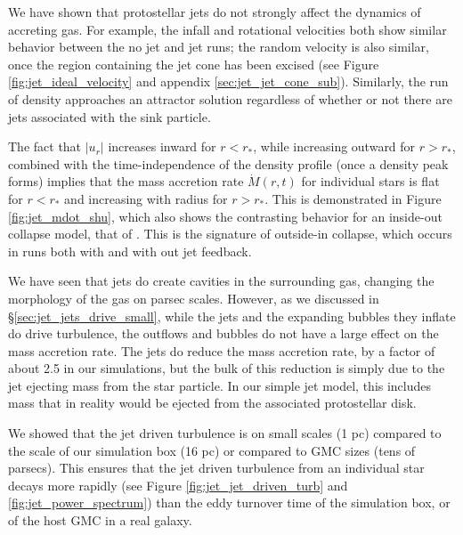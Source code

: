 \documentclass[../dissertation.tex]{subfiles}
\begin{document}
We have shown that protostellar jets do not strongly affect the dynamics of accreting gas.
For example, the infall and rotational velocities both show similar behavior between the no jet and jet runs; the random velocity is also similar, once the region containing the jet cone has been excised (see Figure \ref{fig:jet_ideal_velocity} and appendix \ref{sec:jet_jet_cone_sub}).
Similarly, the run of density approaches an attractor solution regardless of whether or not there are jets associated with the sink particle.

The fact that $|u_r|$ increases inward for $r<r_*$, while increasing outward for $r>r_*$, combined with the time-independence of the density profile (once a density peak forms) implies that the mass accretion rate $\dot M(r,t)$ for individual stars is flat for $r<r_*$ and increasing with radius for $r>r_*$. This is demonstrated in Figure \ref{fig:jet_mdot_shu}, which also shows the contrasting behavior for an inside-out collapse model, that of \cite{1977ApJ...214..488S}.
This is the signature of outside-in collapse, which occurs in runs both with and with out jet feedback.

We have seen that jets do create cavities in the surrounding gas, changing the morphology of the gas on parsec scales.
However, as we discussed in \S \ref{sec:jet_jets_drive_small}, while the jets and the expanding bubbles they inflate do drive turbulence, the outflows and bubbles do not have a large effect on the mass accretion rate.
The jets do reduce the mass accretion rate, by a factor of about 2.5 in our simulations, but the bulk of this reduction is simply due to the jet ejecting mass from the star particle.
In our simple jet model, this includes mass that in reality would be ejected from the associated protostellar disk.

We showed that the jet driven turbulence is on small scales (1 pc) compared to the scale of our simulation box (16 pc) or compared to GMC sizes (tens of parsecs).
This ensures that the jet driven turbulence from an individual star decays more rapidly (see Figure \ref{fig:jet_jet_driven_turb} and \ref{fig:jet_power_spectrum}) than the eddy turnover time of the simulation box, or of the host GMC in a real galaxy.
\end{document}

